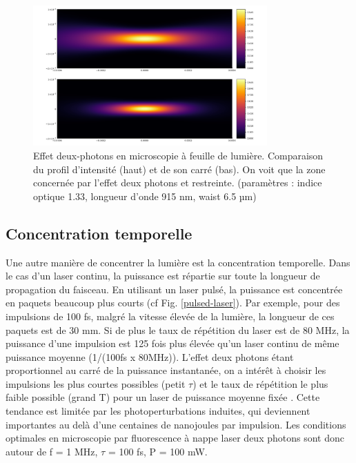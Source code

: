 
\begin{figure}
\centering
\includegraphics[width=0.8\textwidth]{./files/profile-intensity.png}
\caption{Effet deux-photons en microscopie à feuille de lumière. Comparaison du profil d'intensité (haut) et de son carré (bas). On voit que la zone concernée par l'effet deux photons et restreinte. (paramètres : indice optique 1.33, longueur d'onde 915 nm, waist 6.5 µm)
}
\label{2P-intensity-profile}
\end{figure}

\subsection{Concentration temporelle}\label{SECTIONconcentrationtemporelle}

Une autre manière de concentrer la lumière est la concentration temporelle. Dans le cas d'un laser continu, la puissance est répartie sur toute la longueur de propagation du faisceau. En utilisant un laser pulsé, la puissance est concentrée en paquets beaucoup plus courts (cf Fig. \ref{pulsed-laser}). Par exemple, pour des impulsions de 100 fs, malgré la vitesse élevée de la lumière, la longueur de ces paquets est de 30 mm. Si de plus le taux de répétition du laser est de 80 MHz, la puissance d'une impulsion est 125 fois plus élevée qu'un laser continu de même puissance moyenne (1/(100fs x 80MHz)). L'effet deux photons étant proportionnel au carré de la puissance instantanée, on a intérêt à choisir les impulsions les plus courtes possibles (petit $\tau$) et le taux de répétition le plus faible possible (grand T) pour un laser de puissance moyenne fixée \cite{maioli_fast_2020}. Cette tendance est limitée par les photoperturbations induites, qui deviennent importantes au delà d'une centaines de nanojoules par impulsion. Les conditions optimales en microscopie par fluorescence à nappe laser deux photons sont donc autour de f = 1 MHz, $\tau$ = 100 fs, P = 100 mW.

